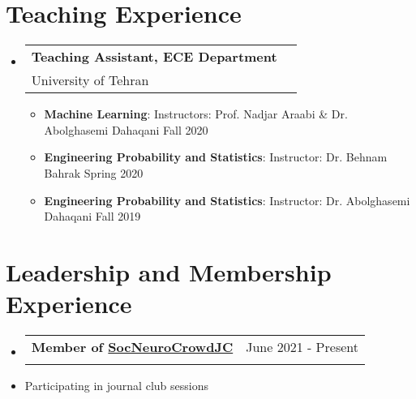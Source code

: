 \documentclass[a4paper,10pt]{article}
\makeatletter
\newcommand{\resumeItem}[2]{
  \item{
    \textbf{#1}{: #2}
  }
}
\newcommand{\resumeSubheading}[4]{
  \item
    \begin{tabular*}{0.98\textwidth}[t]{l@{\extracolsep{\fill}}r}
      \textbf{#1} & #2 \\
      #3 & #4 \\
    \end{tabular*}
}
\newcommand{\resumeSubHeadingListStart}{\begin{itemize}[leftmargin=*]}
\newcommand{\resumeSubHeadingListEnd}{\end{itemize}}
\newcommand{\resumeItemListStart}{\begin{itemize}\vspace{-4pt}}
\newcommand{\resumeItemListEnd}{\end{itemize}}
\makeatother
\begin{document}



\section{Teaching Experience}
  \resumeSubHeadingListStart
      
    \resumeSubheading
      {Teaching Assistant, ECE Department}{}
      {University of Tehran}{}
      \resumeItemListStart
      	\resumeItem{Machine Learning}{Instructors: Prof. Nadjar Araabi \& Dr. Abolghasemi Dahaqani \hfill Fall 2020}
       	\resumeItem{Engineering Probability and Statistics}{Instructor: Dr. Behnam Bahrak \hfill Spring 2020}
       	\resumeItem{Engineering Probability and Statistics}{Instructor: Dr. Abolghasemi Dahaqani \hfill Fall 2019}
      \resumeItemListEnd
    
  \resumeSubHeadingListEnd

\section{Leadership and Membership Experience}
\resumeSubHeadingListStart



\resumeSubheading
{Member of \href{https://crowdcognition.net/journalclub/}{SocNeuroCrowdJC}}
{June 2021 - Present}{}

\resumeItemListStart
\vspace{-0.35cm} 
\item Participating in journal club sessions  %
\resumeItemListEnd
\end{document}
